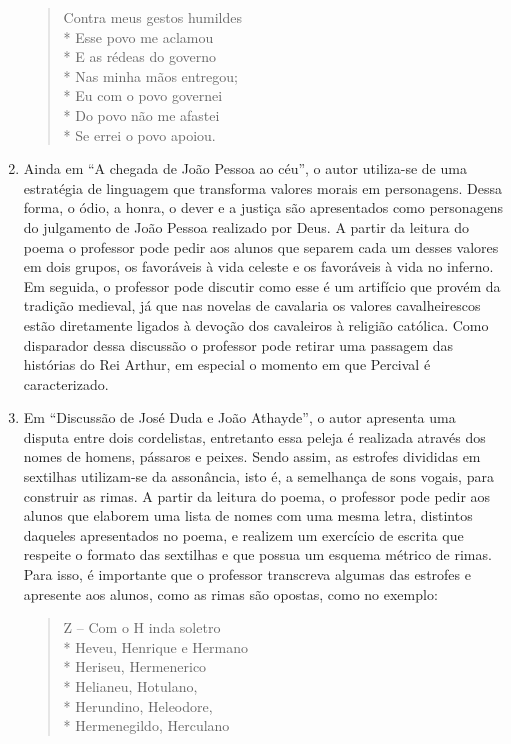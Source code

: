 \begin{enumerate}
\begin{verse}
Contra meus gestos humildes\\*
Esse povo me aclamou\\*
E as rédeas do governo\\*
Nas minha mãos entregou;\\*
Eu com o povo governei\\*
Do povo não me afastei\\*
Se errei o povo apoiou.

\end{verse}

\item Ainda em ``A chegada de João Pessoa ao
céu'', o autor utiliza-se de uma estratégia de
linguagem que transforma valores morais em personagens. Dessa forma, o
ódio, a honra, o dever e a justiça são apresentados como personagens do
julgamento de João Pessoa realizado por Deus. A partir da leitura do
poema o professor pode pedir aos alunos que separem cada um desses
valores em dois grupos, os favoráveis à vida celeste e os favoráveis à
vida no inferno. Em seguida, o professor pode discutir como esse é um
artifício que provém da tradição medieval, já que nas novelas de
cavalaria os valores cavalheirescos estão diretamente ligados à
devoção dos cavaleiros à religião católica. Como disparador dessa
discussão o professor pode retirar uma passagem das histórias do Rei
Arthur, em especial o momento em que Percival é caracterizado.

\item Em ``Discussão de José Duda e João
Athayde'', o autor apresenta uma disputa entre dois
cordelistas, entretanto essa peleja é realizada através dos nomes de
homens, pássaros e peixes. Sendo assim, as estrofes divididas em
sextilhas utilizam-se da assonância, isto é, a semelhança de sons vogais,
para construir as rimas. A partir da leitura do poema, o professor pode
pedir aos alunos que elaborem uma lista de nomes com uma mesma letra,
distintos daqueles apresentados no poema, e realizem um exercício de
escrita que respeite o formato das sextilhas e que possua um esquema
métrico de rimas. Para isso, é importante que o professor transcreva
algumas das estrofes e apresente aos alunos, como as rimas são
opostas, como no exemplo:

\begin{verse}

Z -- Com o H inda soletro\\*
Heveu, Henrique e Hermano\\*
Heriseu, Hermenerico\\*
Helianeu, Hotulano,\\*
Herundino, Heleodore,\\*
Hermenegildo, Herculano


\end{verse}
\end{enumerate}
